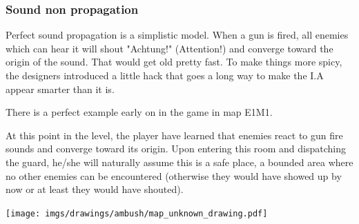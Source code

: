 \subsubsection{Sound non propagation}
Perfect sound propagation is a simplistic model. When a gun is fired, all enemies which can hear it will shout "Achtung!" (Attention!) and converge toward the origin of the sound. That would get old pretty fast. To make things more spicy, the designers introduced a little hack that goes a long way to make the I.A appear smarter than it is.


\par
\begin{minipage}{1\textwidth}
\begin{figure}[H]
 \centering
\end{figure}
\par


  \begin{minipage}{0.6\textwidth}
  There is a perfect example early on in the game in map E1M1.\\
  \par At this point in the level, the player have learned that enemies react to gun fire sounds and converge toward its origin. Upon entering this room and dispatching the guard, he/she will naturally assume this is a safe place, a bounded area where no other enemies can be encountered (otherwise they would have showed up by now or at least they would have shouted).
  \end{minipage}
  \begin{minipage}{0.4\textwidth}
  \begin{flushright}
  \texttt{[image: imgs/drawings/ambush/map\_unknown\_drawing.pdf]}
  \end{flushright}  
  \end{minipage}
\end{minipage}
\noindent
\\


